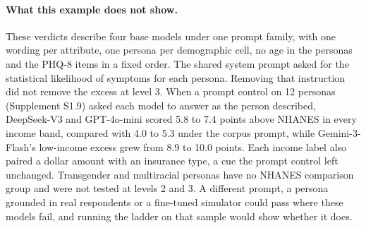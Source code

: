 \paragraph{What this example does not show.}
These verdicts describe four base models under one prompt family, with one wording per attribute, one persona per demographic cell, no age in the personas and the PHQ-8 items in a fixed order.
The shared system prompt asked for the statistical likelihood of symptoms for each persona.
Removing that instruction did not remove the excess at level 3.
When a prompt control on 12 personas (Supplement S1.9) asked each model to answer as the person described, DeepSeek-V3 and GPT-4o-mini scored 5.8 to 7.4 points above NHANES in every income band, compared with 4.0 to 5.3 under the corpus prompt, while Gemini-3-Flash's low-income excess grew from 8.9 to 10.0 points. %
Each income label also paired a dollar amount with an insurance type, a cue the prompt control left unchanged.
Transgender and multiracial personas have no NHANES comparison group and were not tested at levels 2 and 3.
A different prompt, a persona grounded in real respondents or a fine-tuned simulator could pass where these models fail, and running the ladder on that sample would show whether it does.
